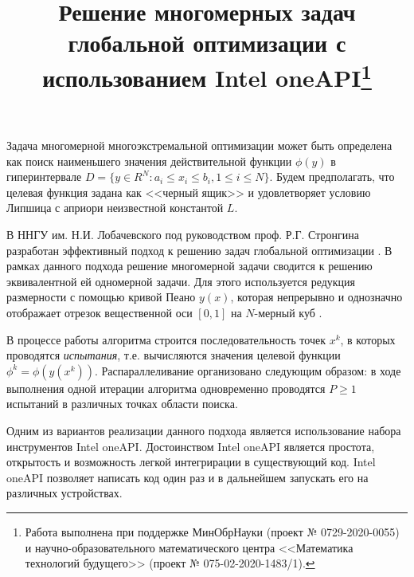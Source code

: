 \documentclass[11pt, oneside, a4paper]{article}
\begin{document}

\title{Решение многомерных задач глобальной оптимизации с использованием Intel oneAPI\footnote{Работа выполнена при поддержке МинОбрНауки (проект № 0729-2020-0055) и научно-образовательного математического центра <<Математика технологий будущего>> (проект № 075-02-2020-1483/1).}}



Задача многомерной многоэкстремальной оптимизации может быть определена как поиск наименьшего значения действительной функции \(\phi(y)\)  в гиперинтервале \(D=\{y\in R^N:a_i\leqslant x_i\leqslant{b_i}, 1\leqslant{i}\leqslant{N}\}\). 
Будем предполагать, что целевая функция задана как <<черный ящик>> и удовлетворяет условию Липшица с априори неизвестной константой \(L\).

В ННГУ им. Н.И. Лобачевского под руководством проф. Р.Г. Стронгина разработан эффективный подход к решению задач глобальной оптимизации \cite{Strongin2013}. В рамках данного подхода решение многомерной задачи сводится к решению эквивалентной ей одномерной задачи. Для этого используется редукция размерности с помощью кривой Пеано \(y(x)\), которая непрерывно и однозначно отображает отрезок вещественной оси \([0,1]\) на \(N\)-мерный куб \cite{Sergeyev2013}.


В процессе работы алгоритма строится последовательность точек \(x^k\), в которых проводятся \textit{испытания}, т.е. вычисляются значения целевой функции \(\phi^k=\phi(y(x^k))\). Распараллеливание организовано следующим образом: в ходе выполнения одной итерации алгоритма одновременно проводятся \(P \geq 1\) испытаний в различных точках области поиска.

Одним из вариантов реализации данного подхода является использование набора инструментов Intel oneAPI. Достоинством Intel oneAPI является простота, открытость и возможность легкой интегрирации в существующий код. Intel oneAPI позволяет написать код один раз и в дальнейшем запускать его на различных устройствах. 
\end{document}

